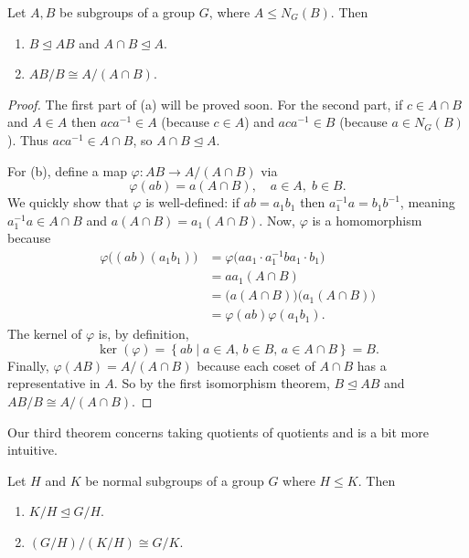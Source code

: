 \documentclass[../m171main.tex]{subfiles}
\begin{document}
\begin{theorem}
    Let $A,B$ be subgroups of a group $G$, where $A \leq N_G(B)$.
    Then
    \begin{enumerate}[label=(\alph*)]
        \item $B \trianglelefteq AB$ and $A \cap B \trianglelefteq A$.
        \item $AB / B \cong A / (A \cap B)$.
    \end{enumerate}
\end{theorem}

\begin{proof}
    The first part of (a) will be proved soon.
    For the second part, if $c \in A \cap B$ and $A \in A$ then $aca^{-1} \in A$ (because $c \in A$) and $aca^{-1} \in B$ (because $a \in N_G(B)$).
    Thus $aca^{-1} \in A \cap B$, so $A \cap B \trianglelefteq A$.

    For (b), define a map $\varphi : AB \to A / (A \cap B)$ via
    \[ \varphi(ab) = a (A \cap B), \quad a \in A, \; b \in B. \]
    We quickly show that $\varphi$ is well-defined: if $ab = a_1b_1$ then $a_1^{-1} a = b_1b^{-1}$, meaning $a_1^{-1} a \in A \cap B$ and $a (A \cap B) = a_1 (A \cap B)$.
    Now, $\varphi$ is a homomorphism because
    \begin{align*}
        \varphi \big( (ab) (a_1 b_1) \big) &= \varphi \big( aa_1 \cdot a_1^{-1} b a_1 \cdot b_1 \big) \\
        &= aa_1 (A \cap B) \\
        &= \big( a (A \cap B) \big) \big( a_1 (A \cap B) \big) \\
        &= \varphi(ab) \varphi(a_1 b_1).
    \end{align*}
    The kernel of $\varphi$ is, by definition,
    \[ \ker(\varphi) = \left\{ ab \mid a \in A, \, b \in B, \, a \in A \cap B \right\} = B. \]
    Finally, $\varphi(AB) = A / (A \cap B)$ because each coset of $A \cap B$ has a representative in $A$.
    So by the first isomorphism theorem, $B \trianglelefteq AB$ and $AB / B \cong A / (A \cap B)$.
\end{proof}

Our third theorem concerns taking quotients of quotients and is a bit more intuitive.

\begin{theorem}
    Let $H$ and $K$ be normal subgroups of a group $G$ where $H \leq K$.
    Then
    \begin{enumerate}[label=(\alph*)]
        \item $K / H \trianglelefteq G / H$.
        \item $(G / H) / (K / H) \cong G / K$.
    \end{enumerate}
\end{theorem}
\end{document}
